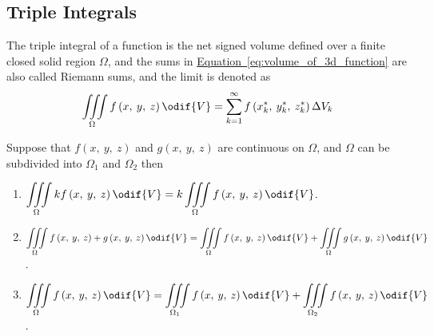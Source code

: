 \documentclass{article}
\begin{document}
\subsection{Triple Integrals}
\begin{definition}
    The triple integral of a function is the net signed volume defined
    over a finite closed solid region \(\Omega\), and the sums in
    \hyperref[eq:volume_of_3d_function]{Equation~\ref{eq:volume_of_3d_function}}
    are also called Riemann sums, and the limit is denoted as
    \begin{equation*}
        \iiint\limits_{\Omega} f\left( x,\: y,\: z \right)  \odif{V}
        = \sum_{k=1}^{\infty} f\left( x_k^\ast,\: y_k^\ast,\: z_k^\ast \right) \Delta V_k
    \end{equation*}
\end{definition}
\begin{tcolorboxlarge}[title={Properties of Triple Integrals}]
    \begin{theorem}
        Suppose that \(f\left( x,\: y,\: z \right) \) and \(g\left( x,\: y,\: z \right)\) are
        continuous on \(\Omega\), and \(\Omega\) can be subdivided into
        \(\Omega_1\) and \(\Omega_2\) then
        \begin{enumerate}[label=\normalfont\alph*)]
            \item \(\displaystyle\iiint\limits_\Omega kf\left( x,\: y,\: z \right) \odif{V}
                  = k\iiint\limits_\Omega f\left( x,\: y,\: z \right) \odif{V}\).
            \item \(\displaystyle\iiint\limits_\Omega f\left( x,\: y,\: z \right) + g\left( x,\: y,\: z \right) \odif{V}
                  = \iiint\limits_\Omega f\left( x,\: y,\: z \right) \odif{V} + \iiint\limits_\Omega g\left( x,\: y,\: z \right) \odif{V}\).
            \item \(\displaystyle\iiint\limits_\Omega f\left( x,\: y,\: z \right) \odif{V}
                  = \iiint\limits_{\Omega_1} f\left( x,\: y,\: z \right) \odif{V} + \iiint\limits_{\Omega_2} f\left( x,\: y,\: z \right) \odif{V}\).
        \end{enumerate}
    \end{theorem}
\end{tcolorboxlarge}
\newpage
\end{document}
